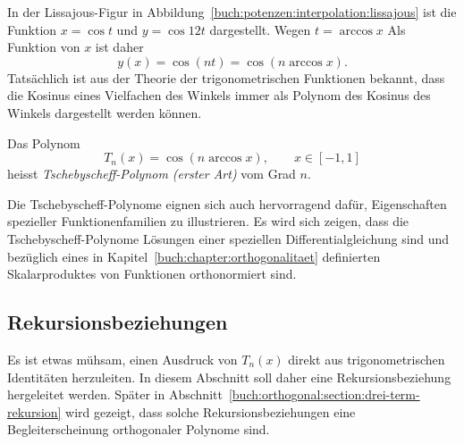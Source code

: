 In der Lissajous-Figur in
Abbildung~\ref{buch:potenzen:interpolation:lissajous} ist
die Funktion $x=\cos t$ und $y=\cos 12t$ dargestellt.
Wegen $t=\arccos x$
Als Funktion von $x$ ist daher
\[
y(x) = \cos(nt)=\cos(n\arccos x).
\]
Tatsächlich ist aus der Theorie der trigonometrischen Funktionen
bekannt, dass die Kosinus eines Vielfachen des Winkels immer
als Polynom des Kosinus des Winkels dargestellt werden können.

\begin{definition}
%
\label{buch:potenzen:def:tschebyscheff}
Das Polynom
\[
T_n(x)
=
\cos (n\arccos x),
\qquad
x\in[-1,1]
\]
heisst
{\em Tschebyscheff-Polynom (erster Art)} vom Grad $n$.
\end{definition}
Die Tschebyscheff-Polynome eignen sich auch hervorragend
dafür, Eigenschaften spezieller Funktionenfamilien zu
illustrieren.
Es wird sich zeigen, dass die Tschebyscheff-Polynome
Lösungen einer speziellen Differentialgleichung sind und
bezüglich eines in Kapitel~\ref{buch:chapter:orthogonalitaet}
definierten Skalarproduktes von Funktionen orthonormiert sind.

%
%
\subsection{Rekursionsbeziehungen
\label{buch:potenzen:tschebyscheff:rekursionsbeziehungen}}
Es ist etwas mühsam, einen Ausdruck von $T_n(x)$ direkt aus
trigonometrischen Identitäten herzuleiten.
In diesem Abschnitt soll daher eine Rekursionsbeziehung
hergeleitet werden.
Später in Abschnitt~\ref{buch:orthogonal:section:drei-term-rekursion}
wird gezeigt, dass solche Rekursionsbeziehungen eine Begleiterscheinung
orthogonaler Polynome sind.

%
%
